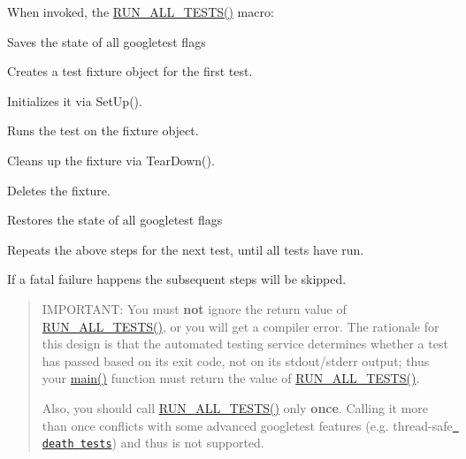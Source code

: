 When invoked, the {\ttfamily \mbox{\hyperlink{googletest-master_2googletest_2include_2gtest_2gtest_8h_a853a3792807489591d3d4a2f2ff9359f}{R\+U\+N\+\_\+\+A\+L\+L\+\_\+\+T\+E\+S\+T\+S()}}} macro\+:


\begin{DoxyEnumerate}
\item Saves the state of all googletest flags
\end{DoxyEnumerate}
\begin{DoxyItemize}
\item Creates a test fixture object for the first test.
\item Initializes it via {\ttfamily Set\+Up()}.
\item Runs the test on the fixture object.
\item Cleans up the fixture via {\ttfamily Tear\+Down()}.
\item Deletes the fixture.
\item Restores the state of all googletest flags
\item Repeats the above steps for the next test, until all tests have run.
\end{DoxyItemize}

If a fatal failure happens the subsequent steps will be skipped.

\begin{quote}
I\+M\+P\+O\+R\+T\+A\+NT\+: You must {\bfseries{not}} ignore the return value of {\ttfamily \mbox{\hyperlink{googletest-master_2googletest_2include_2gtest_2gtest_8h_a853a3792807489591d3d4a2f2ff9359f}{R\+U\+N\+\_\+\+A\+L\+L\+\_\+\+T\+E\+S\+T\+S()}}}, or you will get a compiler error. The rationale for this design is that the automated testing service determines whether a test has passed based on its exit code, not on its stdout/stderr output; thus your {\ttfamily \mbox{\hyperlink{_be_01vektoriaus_2main_8cpp_ae66f6b31b5ad750f1fe042a706a4e3d4}{main()}}} function must return the value of {\ttfamily \mbox{\hyperlink{googletest-master_2googletest_2include_2gtest_2gtest_8h_a853a3792807489591d3d4a2f2ff9359f}{R\+U\+N\+\_\+\+A\+L\+L\+\_\+\+T\+E\+S\+T\+S()}}}.

Also, you should call {\ttfamily \mbox{\hyperlink{googletest-master_2googletest_2include_2gtest_2gtest_8h_a853a3792807489591d3d4a2f2ff9359f}{R\+U\+N\+\_\+\+A\+L\+L\+\_\+\+T\+E\+S\+T\+S()}}} only {\bfseries{once}}. Calling it more than once conflicts with some advanced googletest features (e.\+g. thread-\/safe \href{advanced\#death-tests}{\texttt{ death tests}}) and thus is not supported. \end{quote}


